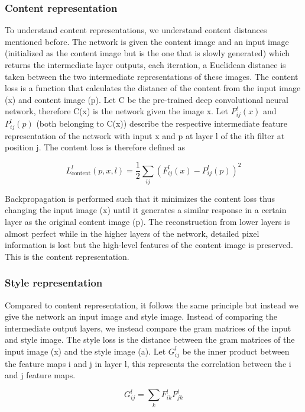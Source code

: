 \documentclass[preprint,12pt]{elsarticle}
\begin{document}
\subsubsection{Content representation }
To understand content representations, we understand content distances mentioned before. The network is given the content image and an input image (initialized as the content image but is the one that is slowly generated) which returns the intermediate layer outputs, each iteration, a Euclidean distance is taken between the two intermediate representations of these images. 
The content loss is a function that calculates the distance of the content from the input image (x) and content image (p). Let C be the pre-trained deep convolutional neural network, therefore C(x) is the network given the image x. Let $F_{ij}^{l}(x)$ and $P_{ij}^{l}(p)$ (both belonging to C(x)) describe the respective intermediate feature representation of the network with input x and p at layer l of the ith filter at position j. The content loss is therefore defined as

\begin{equation}
L_{\text {content}}^{l}(p, x, l)=\frac{1}{2} \sum_{i j}\left(F_{i j}^{l}(x)-P_{i j}^{l}(p)\right)^{2}
\end{equation}

Backpropagation is performed such that it minimizes the content loss thus changing the input image (x) until it generates a similar response in a certain layer as the original content image (p). The reconstruction from lower layers is almost perfect while in the higher layers of the network, detailed pixel information is lost but the high-level features of the content image is preserved. This is the content representation. 

\subsubsection{Style representation}
Compared to content representation, it follows the same principle but instead we give the network an input image and style image. Instead of comparing the intermediate output layers, we instead compare the gram matrices of the input and style image. The style loss is the distance between the gram matrices of the input image (x) and the style image (a). Let $G_{ij}^{l}$ be the inner product between the feature maps i and j in layer l, this represents the correlation between the i and j feature maps.

\begin{equation}
G_{i j}^{l}=\sum_{k} F_{i k}^{l} F_{j k}^{l}
\end{equation}
\end{document}
